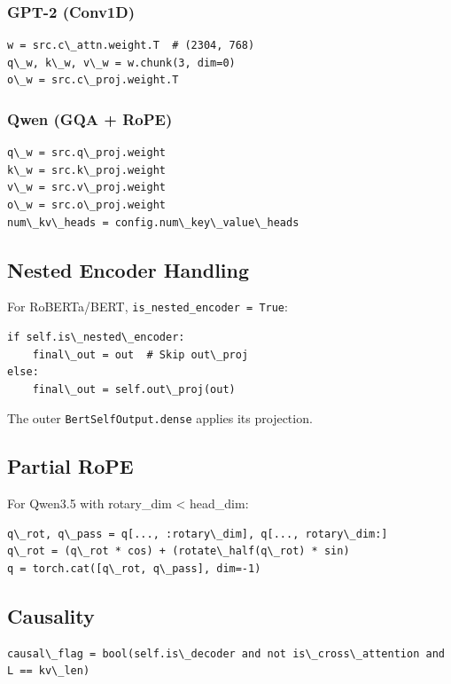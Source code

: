 \subsubsection{GPT-2 (Conv1D)}
\begin{lstlisting}
w = src.c\_attn.weight.T  # (2304, 768)
q\_w, k\_w, v\_w = w.chunk(3, dim=0)
o\_w = src.c\_proj.weight.T
\end{lstlisting}

\subsubsection{Qwen (GQA + RoPE)}
\begin{lstlisting}
q\_w = src.q\_proj.weight
k\_w = src.k\_proj.weight
v\_w = src.v\_proj.weight
o\_w = src.o\_proj.weight
num\_kv\_heads = config.num\_key\_value\_heads
\end{lstlisting}

\subsection{Nested Encoder Handling}

For RoBERTa/BERT, \texttt{is\_nested\_encoder = True}:

\begin{lstlisting}
if self.is\_nested\_encoder:
    final\_out = out  # Skip out\_proj
else:
    final\_out = self.out\_proj(out)
\end{lstlisting}

The outer \texttt{BertSelfOutput.dense} applies its projection.

\subsection{Partial RoPE}

For Qwen3.5 with rotary\_dim \textless{} head\_dim:

\begin{lstlisting}
q\_rot, q\_pass = q[..., :rotary\_dim], q[..., rotary\_dim:]
q\_rot = (q\_rot * cos) + (rotate\_half(q\_rot) * sin)
q = torch.cat([q\_rot, q\_pass], dim=-1)
\end{lstlisting}

\subsection{Causality}

\begin{lstlisting}
causal\_flag = bool(self.is\_decoder and not is\_cross\_attention and L == kv\_len)
\end{lstlisting}

